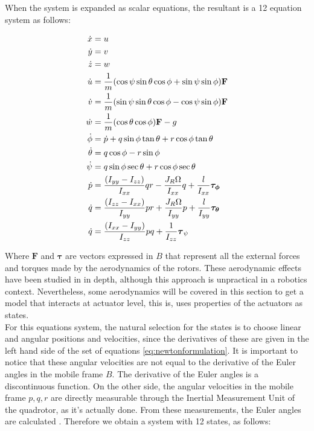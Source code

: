 When the system is expanded as scalar equations, the resultant is a 12 equation system as follows:

\begin{equation} 
\begin{subequations} \label{eq:newtonformulationexpanded}
\begin{align}
	\dot{x} &= u \label{first}\\
	\dot{y} &= v \label{second}\\
	\dot{z} &= w \label{third}\\
	\dot{u} &= \frac{1}{m}(\cos{\psi}\sin{\theta}\cos{\phi} + \sin{\psi}\sin{\phi})\mathbf{F} \label{fourth}\\
	\dot{v} &= \frac{1}{m}(\sin{\psi}\sin{\theta}\cos{\phi} - \cos{\psi}\sin{\phi})\mathbf{F} \label{fifth}\\
	\dot{w} &= \frac{1}{m}(\cos{\theta}\cos{\phi})\mathbf{F} - g\label{sixth}\\
	\dot{\phi} &= \dot{p} + q\sin{\phi}\tan{\theta} +r\cos{\phi}\tan{\theta} \label{seventh}\\
	\dot{\theta} &=  q\cos{\phi} - r\sin{\phi}\label{eighth}\\
	\dot{\psi} &= q\sin{\phi}\sec{\theta} + r\cos{\phi}\sec{\theta}\label{nineth}\\
	\dot{p} &= \frac{(I_{yy} - I_{zz})}{I_{xx}}qr - \frac{J_R\Omega}{I_{xx}}q + \frac{l}{I_{xx}}\boldsymbol{\tau_{\phi}}\label{tenth}\\
	\dot{q} &= \frac{(I_{zz} - I_{xx})}{I_{yy}}pr + \frac{J_R\Omega}{I_{yy}}p + \frac{l}{I_{yy}}\boldsymbol{\tau_{\theta}}\label{eleventh}\\
	\dot{q} &= \frac{(I_{xx} - I_{yy})}{I_{zz}}pq + \frac{1}{I_{zz}}\boldsymbol{\tau}_{\psi} \label{twelveth}\\
\end{align}
\end{subequations}
\end{equation}

Where $\mathbf{F}$ and $\boldsymbol{\tau}$ are vectors expressed in {$B$} that represent all the external forces and torques made by the aerodynamics of the rotors. These aerodynamic effects have been studied in \cite{HoffmannetAl2007} in depth, although this approach is unpractical in a robotics context. Nevertheless, some aerodynamics will be covered in this section to get a model that interacts at actuator level, this is, uses properties of the actuators as states. \\

For this equations system, the natural selection for the states is to choose linear and angular positions and velocities, since the derivatives of these are given in the left hand side of the set of equations \ref{eq:newtonformulation}. It is important to notice that these angular velocities are not equal to the derivative of the Euler angles in the mobile frame {$B$}. The derivative of the Euler angles is a discontinuous function. On the other side, the angular velocities in the mobile frame {$p, q, r$} are directly measurable through the Inertial Measurement Unit of the quadrotor, as it's actually done. From these measurements, the Euler angles are calculated \cite{Raffo2007}. Therefore we obtain a system with 12 states, as follows:

